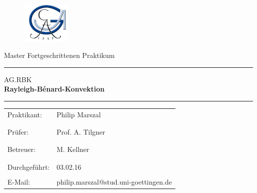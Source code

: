 \documentclass[a4paper, 12pt, ngerman]{article}
\begin{document}
 \begin{titlepage}
 \begin{figure}[t]
 \includegraphics[height=2cm]{georg} \hfill
 \end{figure}

\normalsize
\vspace{1cm}

\begin{center}
\Large Master Fortgeschrittenen Praktikum \\ \vspace{1cm}
\hrule \vspace{3mm}
\large {AG.RBK} \\
\Huge{\bf Rayleigh-B\'enard-Konvektion}
\vspace{5mm}
\hrule
\end{center}

\normalsize


\begin{table}[!h]
\begin{center}

  \begin{tabular}{ll}
  Praktikant: &Philip Marszal\\
   &\\
   &\\
  Prüfer: & Prof. A. Tilgner\\
	&\\
	&\\
  Betreuer: & M. Kellner\\
  &\\
  &\\
	  Durchgeführt: & 03.02.16\\

\vspace{1cm}& \\
  E-Mail: & \ttfamily philip.marszal@stud.uni-goettingen.de\\
\end{tabular}
\end{center}
\end{table}
\end{titlepage}
\newpage
\thispagestyle{empty}
\mbox{}
\thispagestyle{empty}
\newpage
\thispagestyle{empty}
\tableofcontents
\newpage

\pagestyle{fancy}
\end{document}
